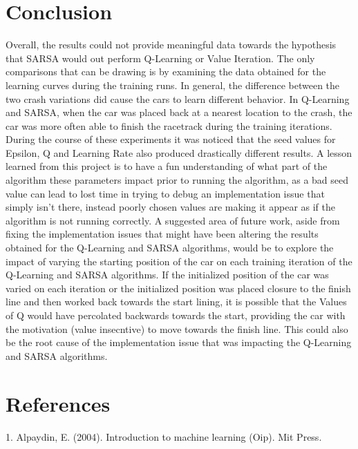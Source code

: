 \documentclass[twoside,11pt]{article}
\begin{document}
\section{Conclusion}
\hspace*{10mm} Overall, the results could not provide meaningful data towards the hypothesis that SARSA would out perform Q-Learning or Value Iteration. The only comparisons that can be drawing is by examining the data obtained for the learning curves during the training runs. In general, the difference between the two crash variations did cause the cars to learn different behavior. In Q-Learning and SARSA, when the car was placed back at a nearest location to the crash, the car was more often able to finish the racetrack during the training iterations. During the course of these experiments it was noticed that the seed values for Epsilon, Q and Learning Rate also produced drastically different results. A lesson learned from this project is to have a fun understanding of what part of the algorithm these parameters impact prior to running the algorithm, as a bad seed value can lead to lost time in trying to debug an implementation issue that simply isn't there, instead poorly chosen values are making it appear as if the algorithm is not running correctly.\newline
\hspace*{10mm} A suggested area of future work, aside from fixing the implementation issues that might have been altering the results obtained for the Q-Learning and SARSA algorithms, would be to explore the impact of varying the starting position of the car on each training iteration of the Q-Learning and SARSA algorithms. If the initialized position of the car was varied on each iteration or the initialized position was placed closure to the finish line and then worked back towards the start lining, it is possible that the Values of Q would have percolated backwards towards the start, providing the car with the motivation (value insecntive) to move towards the finish line. This could also be the root cause of the implementation issue that was impacting the Q-Learning and SARSA algorithms. \newline

\section{References}
1. Alpaydin, E. (2004). Introduction to machine learning (Oip). Mit Press. 

\newpage
\end{document}
